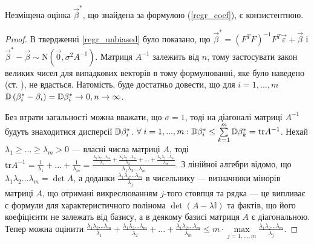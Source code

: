 \begin{proposition}
    Незміщена оцінка $\vec{\beta}^*$, що знайдена за формулою
    (\ref{regr_coef}), є конзистентною.
\end{proposition}
\begin{proof}
    В твердженні \ref{regr_unbiased} було показано, що
    $\vec{\beta}^* = (F^T F)^{-1} F^T \vec{\varepsilon} + \vec{\beta}$ і $\vec{\beta}^* - \vec{\beta} \sim \mathrm{N}(\vec{0},\sigma^2 A^{-1})$.
    Матриця $A^{-1}$ залежить від $n$, тому застосувати закон великих чисел
    для випадкових векторів в тому формулюванні, яке було наведено (ст. \pageref{multivar_lln}), не вдасться.
    Натомість, буде достатньо довести, що для $i=1,..., m$ $\mathbb{D}\left(\beta^*_i - \beta_i\right) = \mathbb{D}\beta^*_i \to 0 , n \to \infty$. 
    
    Без втрати загальності
    можна вважати, що $\sigma = 1$, тоді на діагоналі матриці $A^{-1}$ будуть знаходитися дисперсії $\mathbb{D}\beta_i^*$.
    $\forall \; i = 1,..., m : \mathbb{D}\beta_i^* \leq \sum\limits_{k=1}^m \mathbb{D}\beta_k^* = \mathrm{tr} A^{-1}$.
    Нехай $\lambda_1 \geq ... \geq \lambda_m > 0$ --- власні числа матриці $A$, тоді
    $\mathrm{tr} A^{-1} = \frac{1}{\lambda_1} + ... + \frac{1}{\lambda_m} = 
    \frac{
        \frac{\lambda_1 \lambda_2 ... \lambda_m}{\lambda_1} + 
        \frac{\lambda_1 \lambda_2 ... \lambda_m}{\lambda_2} + ... +
        \frac{\lambda_1 \lambda_2 ... \lambda_m}{\lambda_m}
    }{\lambda_1 \lambda_2 ... \lambda_m}$. З лінійної алгебри відомо, що
    $\lambda_1 \lambda_2 ... \lambda_m = \det A$, а доданки $\frac{\lambda_1 \lambda_2 ... \lambda_m}{\lambda_j}$ в чисельнику --- визначники мінорів матриці $A$,
    що отримані викреслюванням $j$-того стовпця та рядка --- це випливає с формули для характеристичного полінома
    $\det(A - \lambda \mathbb{I})$ та фактів, що його коефіцієнти не залежать від базису, а в деякому базисі матриця $A$ є діагональною.
    Тепер можна оцінити $\frac{\lambda_1 \lambda_2 ... \lambda_m}{\lambda_1} + 
    \frac{\lambda_1 \lambda_2 ... \lambda_m}{\lambda_2} + ... +
    \frac{\lambda_1 \lambda_2 ... \lambda_m}{\lambda_m} \leq m \cdot \underset{j=1,...,m}{\max}\frac{\lambda_1 \lambda_2 ... \lambda_m}{\lambda_j}$.


\end{proof}
